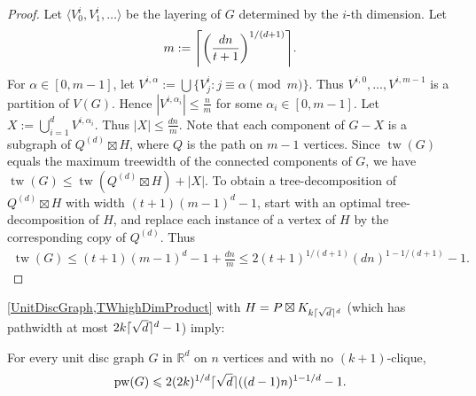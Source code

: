 \documentclass{patmorin}
\DeclareMathOperator{\tw}{tw}
\DeclareMathOperator{\pw}{pw}
\DeclarePairedDelimiter{\ceil}{\lceil}{\rceil}
\renewcommand{\leq}{\leqslant}
\begin{document}
\begin{proof}
Let $\langle{V^i_0,V^i_1,\dots}\rangle$ be the layering of $G$ determined by the $i$-th dimension. 
Let $$m:= \ceil*{ \left(\frac{dn}{t+1} \right)^{1/(d+1)} } .$$ 
For $\alpha\in[0,m-1]$, let $V^{i,\alpha} := \bigcup\{ V^i_j : j\equiv \alpha \pmod{m} \}$. 
Thus $V^{i,0},\dots,V^{i,m-1}$ is a partition of $V(G)$. 
Hence $|V^{i,\alpha_i}| \leq \frac{n}{m}$ for some $\alpha_i\in[0,m-1]$. 
Let $X:= \bigcup_{i=1}^d V^{i,\alpha_i}$. Thus $|X| \leq \frac{dn}{m}$. 
Note that each component of $G-X$ is a subgraph of $Q^{(d)} \boxtimes H$, where $Q$ is the path on $m-1$ vertices. Since $\tw(G)$ equals the maximum treewidth of the connected components of $G$, we have 
$\tw(G) \leq \tw( Q^{(d)} \boxtimes H ) + |X| $. 
To obtain a tree-decomposition of $Q^{(d)} \boxtimes H$ with width $(t+1) (m-1)^d - 1$, start with an optimal tree-decomposition of $H$, and replace each instance of a vertex of $H$ by the corresponding copy of $Q^{(d)}$. Thus
\begin{align*}
\tw(G) \leq  (t+1) (m-1)^d - 1 + \frac{dn}{m}
 \leq 2  (t+1)^{ 1/(d+1) } (dn)^{1- 1/(d+1)}   -  1.
\end{align*}
\end{proof}

\cref{UnitDiscGraph,TWhighDimProduct} with $H=P\boxtimes K_{k \ceil{\sqrt{d}}^d}$ (which has pathwidth 
at most $2k \ceil{\sqrt{d}}^d-1$) imply:

\begin{cor}
For every unit disc graph $G$ in $\mathbb{R}^d$ on $n$ vertices and with no $(k+1)$-clique,
$$\pw(G) \leq 2  (2k)^{ 1/d } \ceil{\sqrt{d}} ((d-1)n)^{1- 1/d}   -  1.$$
\end{cor}


\end{document}
